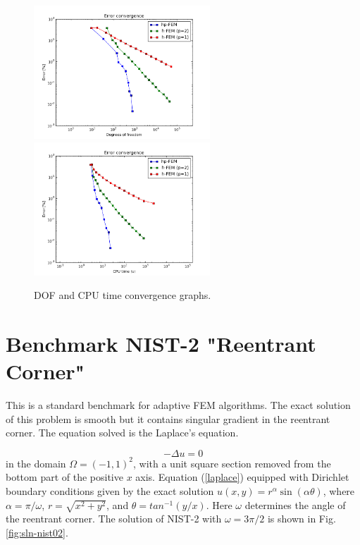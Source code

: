 \documentclass[12pt]{elsarticle}
\begin{document}
\begin{figure}[!ht]
\centering
\includegraphics[height=5cm]{nist/nist-1/conv_dof_aniso.png}\ \
\includegraphics[height=5cm]{nist/nist-1/conv_cpu_aniso.png}
\caption{DOF and CPU time convergence graphs.}
\label{fig:nist-1-conv}
\end{figure}



\section{Benchmark NIST-2 "Reentrant Corner"}
\label{sec:bench-2}

This is a standard benchmark for adaptive FEM algorithms.
The exact solution of this problem is smooth but it contains
singular gradient in the reentrant corner.
The equation solved is the Laplace's equation.

\begin{equation} \label{laplace}
-\Delta u = 0
\end{equation}
in the domain $\Omega = (-1, 1)^2$, with a unit square
section removed from the bottom part of the positive $x$ axis.
Equation (\ref{laplace}) equipped with Dirichlet
boundary conditions given by the exact solution
$u(x, y) = r^{\alpha}\sin(\alpha \theta)$,
where $\alpha = \pi / \omega$, $r = \sqrt{x^2+y^2}$,
and $\theta = tan^{-1}(y/x)$. Here $\omega $ determines
the angle of the reentrant corner.
The solution of NIST-2 with $\omega = 3 \pi / 2$
is shown in Fig. \ref{fig:sln-nist02}.
\end{document}
